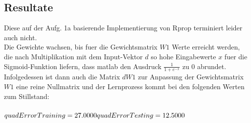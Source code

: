 \documentclass[12pt]{article}
\begin{document}
\newpage

\subsection{Resultate}
Diese auf der Aufg. 1a basierende Implementierung von Rprop terminiert leider auch nicht.\\
Die Gewichte wachsen, bis fuer die Gewichtsmatrix $W1$ Werte erreicht werden, die nach Multiplikation mit dem Input-Vektor $d$ so hohe Eingabewerte $x$ fuer die Sigmoid-Funktion liefern, dass matlab den Ausdruck $\frac{1}{1 + e^{-x}}$ zu $0$ abrundet. Infolgedessen ist dann auch die Matrix $dW1$ zur Anpassung der Gewichtsmatrix $W1$ eine reine Nullmatrix und der Lernprozess kommt bei den folgenden Werten zum Stillstand:\\
\\
$quadErrorTraining = 27.0000\\
quadErrorTesting = 12.5000$
\end{document}

